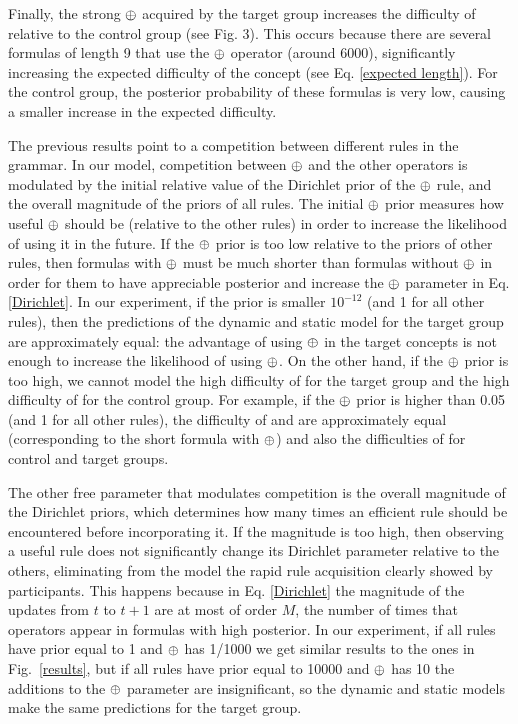 Finally, the strong $\oplus$ acquired by the target group increases the difficulty of \testb relative to the control group (see Fig. 3). This occurs because there are several formulas of length 9 that use the $\oplus$ operator (around 6000), significantly increasing the expected difficulty of the concept (see Eq. \eqref{expected length}). For the control group, the posterior probability of these formulas is very low, causing a smaller increase in the expected difficulty.

The previous results point to a competition between different rules in the grammar. In our model, competition between $\oplus$ and the other operators is modulated by the initial relative value of the Dirichlet prior of the $\oplus$ rule, and the overall magnitude of the priors of all rules. The initial $\oplus$ prior measures how useful $\oplus$ should be (relative to the other rules) in order to increase the likelihood of using it in the future. If the $\oplus$ prior is too low relative to the priors of other rules, then formulas with $\oplus$ must be much shorter than formulas without $\oplus$ in order for them to have appreciable posterior and increase the $\oplus$ parameter in Eq. \eqref{Dirichlet}. In our experiment, if the prior is smaller $10^{-12}$ (and 1 for all other rules), then the predictions of the dynamic and static model for the target group are approximately equal: the advantage of using $\oplus$ in the target concepts is not enough to increase the likelihood of using $\oplus$. On the other hand, if the $\oplus$ prior is too high, we cannot model the high difficulty of \targetb for the target group and the high difficulty of \testa for the control group. For example, if the $\oplus$ prior is higher than 0.05 (and 1 for all other rules), the difficulty of \targetb and \targetd are approximately equal (corresponding to the short formula with $\oplus$) and also the difficulties of \testa for control and target groups.

The other free parameter that modulates competition is the overall magnitude of the Dirichlet priors, which determines how many times an efficient rule should be encountered before incorporating it. If the magnitude is too high, then observing a useful rule does not significantly change its Dirichlet parameter relative to the others, eliminating from the model the rapid rule acquisition clearly showed by participants. This happens because in Eq. \eqref{Dirichlet} the magnitude of the updates from $t$ to $t+1$ are at most of order $M$, the number of times that operators appear in formulas with high posterior. In our experiment, if all rules have prior equal to 1 and $\oplus$ has 1/1000 we get similar results to the ones in Fig.~\ref{results}, but if all rules have prior equal to 10000 and $\oplus$ has 10 the additions to the $\oplus$ parameter are insignificant, so the dynamic and static models make the same predictions for the target group.

